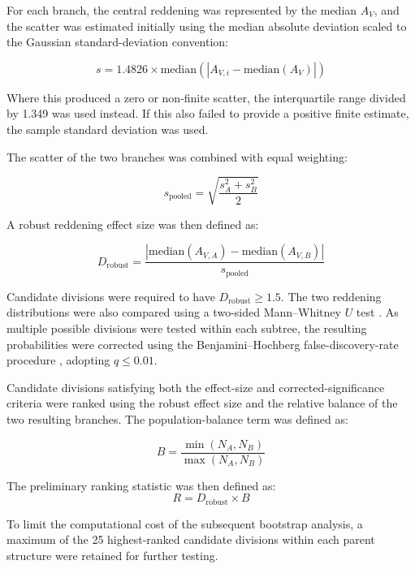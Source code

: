 \documentclass[fleqn,usenatbib]{mnras}
\begin{document}
For each branch, the central reddening was represented by the median $A_V$, and the scatter was estimated initially using the median absolute deviation scaled to the Gaussian standard-deviation convention:

\begin{equation}
    s = 1.4826 \times \text{median}\left(|A_{V,i} - \text{median}(A_V)|\right)
\end{equation}

Where this produced a zero or non-finite scatter, the interquartile range divided by 1.349 was used instead. If this also failed to provide a positive finite estimate, the sample standard deviation was used.

The scatter of the two branches was combined with equal weighting:

\begin{equation}
    s_{\text{pooled}} = \sqrt{\frac{s_A^2 + s_B^2}{2}}
\end{equation}

A robust reddening effect size was then defined as:

\begin{equation}
    D_{\text{robust}} = \frac{|\text{median}(A_{V,A}) - \text{median}(A_{V,B})|}{s_{\text{pooled}}}
\end{equation}

Candidate divisions were required to have $D_{\text{robust}} \ge 1.5$. The two reddening distributions were also compared using a two-sided Mann--Whitney $U$ test \citep{Mann1947}. As multiple possible divisions were tested within each subtree, the resulting probabilities were corrected using the Benjamini--Hochberg false-discovery-rate procedure \citep{Benjamini1995}, adopting $q \le 0.01$.

Candidate divisions satisfying both the effect-size and corrected-significance criteria were ranked using the robust effect size and the relative balance of the two resulting branches. The population-balance term was defined as:


\begin{equation}
B = \frac{\min(N_A, N_B)}{\max(N_A, N_B)}
\end{equation}


The preliminary ranking statistic was then defined as:
\begin{equation}
R = D_{\mathrm{robust}} \times B
\end{equation}

To limit the computational cost of the subsequent bootstrap analysis, a maximum of the 25 highest-ranked candidate divisions within each parent structure were retained for further testing.
\end{document}
